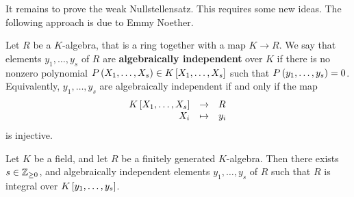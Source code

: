 It remains to prove the weak Nullstellensatz. This requires some new ideas. The following approach is due to Emmy Noether.

\pagebreak

\begin{definition}
Let $ R $ be a $ K $-algebra, that is a ring together with a map $ K \to R $. We say that elements $ y_1, \dots, y_s $ of $ R $ are \textbf{algebraically independent} over $ K $ if there is no nonzero polynomial $ P\rb{X_1, \dots, X_s} \in K\sb{X_1, \dots, X_s} $ such that $ P\rb{y_1, \dots, y_s} = 0 $. Equivalently, $ y_1, \dots, y_s $ are algebraically independent if and only if the map
$$ \function{K\sb{X_1, \dots, X_s}}{R}{X_i}{y_i} $$
is injective.
\end{definition}

\begin{proposition}
Let $ K $ be a field, and let $ R $ be a finitely generated $ K $-algebra. Then there exists $ s \in \Z_{\ge 0} $, and algebraically independent elements $ y_1, \dots, y_s $ of $ R $ such that $ R $ is integral over $ K\sb{y_1, \dots, y_s} $.
\end{proposition}

